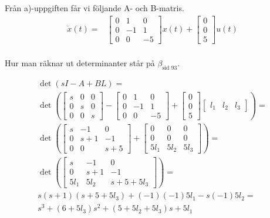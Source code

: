 \documentclass[a4paper]{article}
\newcommand{\mhb}[1]{$\beta_{\text{#1}}$}     %
\begin{document}
Från a)-uppgiften får vi följande A- och B-matris.
\begin{align*}
  \dot{x}(t) =& \begin{bmatrix}0 & 1 & 0 \\ 0 & -1 & 1 \\ 0 & 0 & -5\end{bmatrix} x(t) + \begin{bmatrix}0 \\ 0 \\ 5\end{bmatrix} u(t) \\
\end{align*}

Hur man räknar ut determinanter står på \mhb{sid 93}.

\begin{align*}
  \det(s I - A + BL) = \\
  \det\left(\begin{bmatrix}s & 0 & 0 \\ 0 & s & 0 \\ 0 & 0 & s \end{bmatrix} - \begin{bmatrix}0 & 1 & 0 \\ 0 & -1 & 1 \\ 0 & 0 & -5\end{bmatrix} + \begin{bmatrix}0 \\ 0 \\ 5\end{bmatrix} \begin{bmatrix}l_1 & l_2 & l_3\end{bmatrix} \right) = \\
  \det \left(\begin{bmatrix}s & -1 & 0 \\ 0 & s + 1 & -1 \\ 0 & 0 & s + 5 \end{bmatrix} + \begin{bmatrix}0 & 0 & 0 \\ 0 & 0 & 0 \\ 5l_1 & 5l_2 & 5l_3\end{bmatrix} \right) =\\
  \det \left(\begin{bmatrix}s & -1 & 0 \\ 0 & s + 1 & -1 \\ 5l_1 & 5l_2 & s + 5 + 5l_3 \end{bmatrix} \right) = \\
  s(s+1)(s+5+5l_3) + (-1)(-1)5l_1 - s(-1)5l_2 =\\
  s^3 + (6+5l_3)s^2 + (5 + 5l_2 + 5l_3)s + 5l_1
\end{align*}
\end{document}
